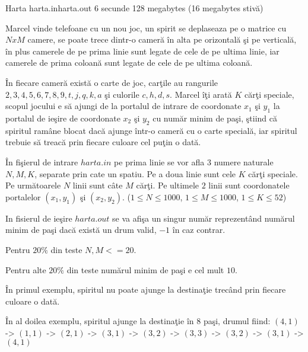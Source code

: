 \begin{problem}{Harta}
{harta.in}{harta.out}
{6 secunde} {128 megabytes (16 megabytes stiv\u{a})}{}

Marcel vinde telefoane cu un nou joc, un spirit se deplaseaza pe o matrice cu $NxM$ camere, se poate trece dintr-o camer\u{a} \^{i}n alta pe orizontal\u{a} \c{s}i pe vertical\u{a}, \^{i}n plus camerele de pe prima linie sunt legate de cele de pe ultima linie, iar camerele de prima coloan\u{a} sunt legate de cele de pe ultima coloan\u{a}.

\^{I}n fiecare camer\u{a} exist\u{a} o carte de joc, car\c{t}ile au rangurile ${2, 3, 4, 5, 6, 7, 8, 9, t, j, q, k, a}$ \c{s}i culorile ${c, h, d, s}$. Marcel \^{i}\c{t}i arat\u{a} $K$ c\u{a}r\c{t}i speciale, scopul jocului e s\u{a} ajungi de la portalul de intrare de coordonate $x_1$ \c{s}i $y_1$ la portalul de ie\c{s}ire de coordonate $x_2$ \c{s}i $y_2$ cu num\u{a}r minim de pa\c{s}i, \c{s}tiind c\u{a} spiritul ram\^{a}ne blocat dac\u{a} ajunge \^{i}ntr-o camer\u{a} cu o carte special\u{a}, iar spiritul trebuie s\u{a} treac\u{a} prin fiecare culoare cel pu\c{t}in o dat\u{a}.

\InputFile
\^{I}n fi\c{s}ierul de intrare $harta.in$ pe prima linie se vor afla $3$ numere naturale $N, M, K$, separate prin cate un spatiu. Pe a doua linie sunt cele $K$ c\u{a}r\c{t}i speciale. Pe urm\u{a}toarele $N$ linii sunt c\^{a}te $M$ c\u{a}r\c{t}i. Pe ultimele $2$ linii sunt coordonatele portalelor $(x_1, y_1)$ \c{s}i $(x_2, y_2)$. ($1 \le N \le 1000$, $1 \le M \le 1000$, $1 \le K \le 52$)

\OutputFile
In fisierul de ie\c{s}ire $harta.out$ se va afi\c{s}a un singur num\u{a}r reprezent\^{a}nd num\u{a}rul minim de pa\c{s}i dac\u{a} exist\u{a} un drum valid, $-1$ \^{i}n caz contrar.

\Notes

Pentru $20 \%$ din teste $N, M <= 20$.

Pentru alte $20 \%$ din teste num\u{a}rul minim de pa\c{s}i e cel mult $10$.

\Examples

\begin{example}
%
%
\end{example}

\Explanations

\^{I}n primul exemplu, spiritul nu poate ajunge la destina\c{t}ie trec\^{a}nd prin fiecare culoare o dat\u{a}.

\^{I}n al doilea exemplu, spiritul ajunge la destina\c{t}ie \^{i}n $8$ pa\c{s}i, drumul fiind: $(4,1)$ -> $(1, 1)$ -> $(2, 1)$ -> $(3, 1)$ -> $(3, 2)$ -> $(3, 3)$ -> $(3, 2)$ -> $(3, 1)$ -> $(4, 1)$

\end{problem}
